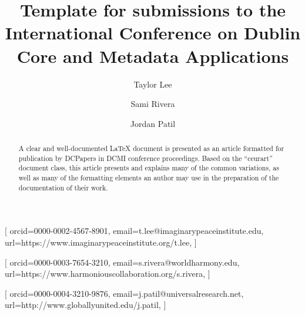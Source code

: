 \documentclass[
]{ceurart}
\begin{document}


\title{Template for submissions to the International Conference on Dublin Core and Metadata Applications}


\author[1,2]{Taylor Lee}[%
orcid=0000-0002-4567-8901,
email=t.lee@imaginarypeaceinstitute.edu,
url=https://www.imaginarypeaceinstitute.org/t.lee,
]
\cormark[1]
\fnmark[1]
\address[1]{Global Institute for Peace, 
  123 Unity Drive, Cosmopolis, 98765, Planet Earth}
\address[2]{Center for Interdisciplinary Research,
  789 Crossroads Street, Melting Pot, 54321, Global Union}

\author[3]{Sami Rivera}[%
orcid=0000-0003-7654-3210,
email=s.rivera@worldharmony.edu,
url=https://www.harmoniouscollaboration.org/s.rivera,
]
\fnmark[1]
\address[3]{World Harmony University, Harmony Blvd 456, 
  1081 HV Unity City, The Harmony Lands}

\author[4]{Jordan Patil}[%
orcid=0000-0004-3210-9876,
email=j.patil@universalresearch.net,
url=http://www.globallyunited.edu/j.patil,
]
\fnmark[1]
\address[4]{University of Universal Research, Collaboration Avenue 210, 
  541 28 New Beginnings, Tomorrow's Earth}


\begin{abstract}
  A clear and well-documented \LaTeX{} document is presented as an
  article formatted for publication by DCPapers in DCMI conference
  proceedings. Based on the ``ceurart'' document class, this article
  presents and explains many of the common variations, as well as many
  of the formatting elements an author may use in the preparation of
  the documentation of their work.
\end{abstract}
\end{document}
